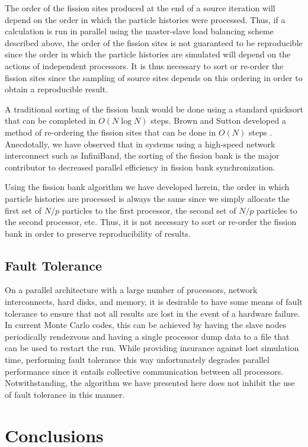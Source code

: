 The order of the fission sites produced at the end of a source
iteration will depend on the order in which the particle histories
were processed. Thus, if a calculation is run in parallel using the
master-slave load balancing scheme described above, the order of the
fission sites is not guaranteed to be reproducible since the order in
which the particle histories are simulated will depend on the actions
of independent processors. It is thus necessary to sort or re-order
the fission sites since the sampling of source sites depends on this
ordering in order to obtain a reproducible result.

A traditional sorting of the fission bank would be done using a
standard quicksort that can be completed in $O(N \log N)$ steps. Brown
and Sutton developed a method of re-ordering the fission sites that
can be done in $O(N)$ steps \cite{brown-sort}. Anecdotally, we have
observed that in systems using a high-speed network interconnect such
as InfiniBand, the sorting of the fission bank is the major
contributor to decreased parallel efficiency in fission bank
synchronization.

Using the fission bank algorithm we have developed herein, the order
in which particle histories are processed is always the same since we
simply allocate the first set of $N/p$ particles to the first
processor, the second set of $N/p$ particles to the second processor,
etc. Thus, it is not necessary to sort or re-order the fission bank in
order to preserve reproducibility of results.

\subsection{Fault Tolerance}

On a parallel architecture with a large number of processors, network
interconnects, hard disks, and memory, it is desirable to have some
means of fault tolerance to ensure that not all results are lost in
the event of a hardware failure. In current Monte Carlo codes, this
can be achieved by having the slave nodes periodically rendezvous and
having a single processor dump data to a file that can be used to
restart the run. While providing insurance against lost simulation
time, performing fault tolerance this way unfortunately degrades
parallel performance since it entails collective communication between
all processors. Notwithstanding, the algorithm we have presented here
does not inhibit the use of fault tolerance in this manner.

\section{Conclusions}
\label{sec:conclusions}

